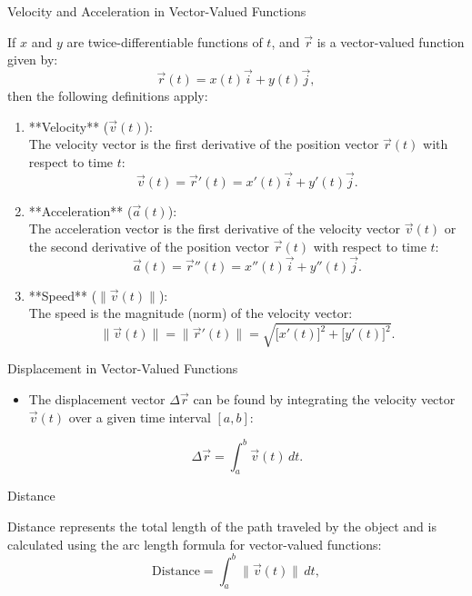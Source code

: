 \documentclass[12pt]{article}
\theoremstyle{beautifulthm}
\begin{document}
\begin{mytheorem}{Velocity and Acceleration in Vector-Valued Functions}{}

If $x$ and $y$ are twice-differentiable functions of $t$, and $\vec{r}$ is a vector-valued function given by:
\[
\vec{r}(t) = x(t)\vec{i} + y(t)\vec{j},
\]
then the following definitions apply:

\begin{enumerate}
    \item **Velocity** ($\vec{v}(t)$):\\
    The velocity vector is the first derivative of the position vector $\vec{r}(t)$ with respect to time $t$:
    \[
    \vec{v}(t) = \vec{r}'(t) = x'(t)\vec{i} + y'(t)\vec{j}.
    \]

    \item **Acceleration** ($\vec{a}(t)$):\\
    The acceleration vector is the first derivative of the velocity vector $\vec{v}(t)$ or the second derivative of the position vector $\vec{r}(t)$ with respect to time $t$:
    \[
    \vec{a}(t) = \vec{r}''(t) = x''(t)\vec{i} + y''(t)\vec{j}.
    \]

    \item **Speed** ($\|\vec{v}(t)\|$):\\
    The speed is the magnitude (norm) of the velocity vector:
    \[
    \|\vec{v}(t)\| = \|\vec{r}'(t)\| = \sqrt{\big[x'(t)\big]^2 + \big[y'(t)\big]^2}.
    \]
\end{enumerate}
    
\end{mytheorem}

\begin{mytheorem}{Displacement in Vector-Valued Functions}{}
    
\begin{enumerate}
    \begin{itemize}

        \item The displacement vector $\Delta \vec{r}$ can be found by integrating the velocity vector $\vec{v}(t)$ over a given time interval $[a, b]$:

\[
\Delta \vec{r} = \int_a^b \vec{v}(t) \, dt.
\]
    \end{itemize}
\end{enumerate}

\end{mytheorem}

\begin{mytheorem}{Distance}{}
 \begin{enumerate}
        Distance represents the total length of the path traveled by the object and is calculated using the arc length formula for vector-valued functions:
        \[
        \text{Distance} = \int_a^b \|\vec{v}(t)\| \, dt,
        \]
\end{enumerate}
\end{mytheorem}
\end{document}
